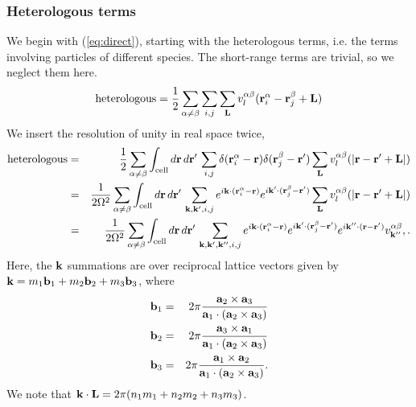 \subsubsection{Heterologous terms}
We begin with (\ref{eq:direct}), starting with the heterologous terms,
i.e. the terms involving particles of different species.  The
short-range terms are trivial, so we neglect them here.
\begin{equation}
\text{heterologous} = \frac{1}{2} \sum_{\alpha \neq \beta} \sum_{i,j} \sum_\vL
v^{\alpha\beta}_l(\vr_i^\alpha - \vr_j^\beta + \vL)
\end{equation}
We insert the resolution of unity in real space twice,
\begin{eqnarray}
\text{heterologous} & = & \frac{1}{2}\sum_{\alpha \neq \beta} \int_\text{cell} d\vr \, d\vr' \, \sum_{i,j}
\delta(\vr_i^\alpha - \vr) \delta(\vr_j^\beta-\vr') \sum_\vL
v^{\alpha\beta}_l(|\vr - \vr' + \vL|) \\
& = & \frac{1}{2\Omega^2}\sum_{\alpha \neq \beta} \int_\text{cell} d\vr \, d\vr' \, \sum_{\vk, \vk', i, j} e^{i\vk\cdot(\vr_i^\alpha
  - \vr)} e^{i\vk'\cdot(\vr_j^\beta - \vr')} \sum_\vL
v^{\alpha\beta}_l(|\vr - \vr' + \vL|) \nonumber \\
& = & \frac{1}{2\Omega^2} \sum_{\alpha \neq \beta} \int_\text{cell} d\vr \, d\vr'\,
\sum_{\vk, \vk', \vk'', i, j} e^{i\vk\cdot(\vr_i^\alpha - \vr)}
e^{i\vk'\cdot(\vr_j^\beta-\vr')} e^{i\vk''\cdot(\vr -\vr')}
v^{\alpha\beta}_{\vk''}, \nonumber.
\end{eqnarray}
Here, the $\vk$ summations are over reciprocal lattice vectors given
by $\vk = m_1 \vb_1 + m_2\vb_2 + m_3\vb_3$, where
\begin{eqnarray}
\vb_1 & = & 2\pi \frac{\va_2 \times \va_3}{\va_1 \cdot (\va_2 \times
  \va_3)} \nonumber \\
\vb_2 & = & 2\pi \frac{\va_3 \times \va_1}{\va_1 \cdot (\va_2 \times
  \va_3)} \\
\vb_3 & = & 2\pi \frac{\va_1 \times \va_2}{\va_1 \cdot (\va_2 \times
  \va_3)} \nonumber.
\end{eqnarray}
We note that $\vk \cdot \vL = 2\pi(n_1 m_1 + n_2 m_2 + n_3 m_3)$. 

